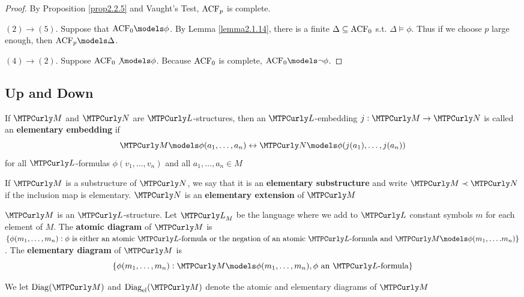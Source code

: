 \documentclass[11pt]{article}
\begin{document}
\begin{proof}
By Proposition \ref{prop2.2.5} and Vaught's Test, \(\text{ACF}_p\) is complete.

\((2)\to(5)\). Suppose that \(\ACF_0\models\phi\). By Lemma \ref{lemma2.1.14},
there is a finite \(\Delta\subseteq\text{ACF}_0\) s.t. \(\Delta\models\phi\). Thus
if we choose \(p\) large enough, then \(\ACF_p\models\Delta\).

\((4)\to(2)\). Suppose \(\ACF_0\not\models\phi\). Because \(\text{ACF}_0\) is
complete, \(\ACF_0\models\neg\phi\).
\end{proof}

\subsection{Up and Down}
\label{sec:orgc6dbd7c}


\begin{definition}[]
If \(\calm\) and \(\caln\) are \(\call\)-structures, then an
\(\call\)-embedding \(j:\calm\to\caln\) is called an \textbf{elementary embedding} if
\begin{equation*}
\calm\models\phi(a_1,\dots,a_n)\leftrightarrow\caln\models\phi(j(a_1),\dots,j(a_n))
\end{equation*}
for all \(\call\)-formulas \(\phi(v_1,\dots,v_n)\) and all \(a_1,\dots,a_n\in
   M\)

If \(\calm\) is a substructure of \(\caln\), we say that it is an \textbf{elementary
substructure} and write \(\calm\prec\caln\) if the inclusion map is elementary.
\(\caln\) is an \textbf{elementary extension} of \(\calm\)
\end{definition}

\begin{definition}[]
\(\calm\) is an \(\call\)-structure. Let \(\call_M\) be the language where we
add to \(\call\) constant symbols \(m\) for each element of \(M\). The \textbf{atomic
diagram} of \(\calm\) is \(\{\phi(m_1,\dots,m_n):\phi\text{ is either an atomic
   }\call\text{-formula or the negation of an atomic }\call\text{-formula and
   }\calm\models\phi(m_1,\dots.m_n)\}\).
The \textbf{elementary diagram} of \(\calm\) is 
\begin{equation*}
\{\phi(m_1,\dots,m_n):\calm\models\phi(m_1,\dots,m_n),\phi\text{ an 
\(\call\)-formula}\}
\end{equation*}

We let \(\Diag(\calm)\) and \(\Diag_{\el}(\calm)\) denote the atomic and
elementary diagrams of \(\calm\)
\end{definition}
\end{document}
